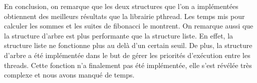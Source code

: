 
En conclusion, on remarque que les deux structures que l'on a
implémentées obtiennent des meilleurs résultats que la librairie
pthread. Les temps mis pour calculer les sommes et les suites de
fibonacci le montrent. On remarque aussi que la structure d'arbre est
plus performante que la structure liste. En effet, la structure liste
ne fonctionne plus au delà d'un certain seuil. De plus, la structure
d'arbre a été implémentée dans le but de gérer les priorités
d'exécution entre les threads. Cette fonction n'a finalement pas été
implémentée, elle s'est révélée très complexe et nous avons manqué de
temps.
